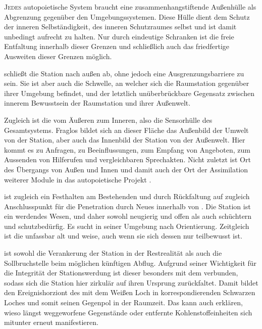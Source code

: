     \begin{newstuff}
        \lettrine{J}{edes} autopoietische System braucht eine zusammenhangstiftende Außenhülle als  Abgrenzung gegenüber den Umgebungssystemen. Diese Hülle dient dem Schutz der inneren Selbständigkeit, des inneren Schutzraumes selbst und ist damit unbedingt aufrecht zu halten. Nur durch eindeutige Schranken ist die freie Entfaltung innerhalb dieser Grenzen und schließlich auch das friedfertige Ausweiten dieser Grenzen möglich.


         schließt die Station nach außen ab, ohne jedoch eine Ausgrenzungsbarriere zu sein. Sie ist aber auch die Schwelle, an welcher sich die Raumstation gegenüber ihrer Umgebung befindet, und der letztlich unüberbrückbare Gegensatz zwischen innerem Bewusstsein der Raumstation und ihrer Außenwelt. 
        
        Zugleich ist  die  vom Äußeren zum Inneren, also die Sensorhülle des Gesamtsystems. Fraglos bildet sich an dieser Fläche das Außenbild der Umwelt von der Station, aber auch das Innenbild der Station von der Außenwelt. Hier kommt es zu Anfragen, zu Beeinflussungen, zum Empfang von Angeboten, zum Aussenden von Hilferufen und vergleichbaren Sprechakten. Nicht zuletzt ist  Ort des Übergangs von Außen und Innen und damit auch der Ort der Assimilation weiterer Module in das autopoietische Projekt .
        
         ist zugleich ein Festhalten am Bestehenden und durch Rückfaltung auf  zugleich Anschlusspunkt für die Penetration durch Neues innerhalb von . Die Station ist ein werdendes Wesen, und daher sowohl neugierig und offen als auch schüchtern und schutzbedürfig. Es sucht in seiner Umgebung nach Orientierung. Zeitgleich ist die  unfassbar alt und weise, auch wenn sie sich dessen nur teilbewusst ist.
        
         ist sowohl die Verankerung der Station in der Restrealität als auch die Sollbruchstelle beim möglichen künftigen Abflug. Aufgrund seiner Wichtigkeit für die Integrität der Stationswerdung ist dieser  besonders mit dem  verbunden, sodass sich die Station hier zirkulär auf ihren Ursprung zurückfaltet. Damit bildet  den Ereignishorziont des mit dem Weißen Loch in  korrespondierenden Schwarzen Loches und somit seinen Gegenpol in der Raumzeit. Das kann auch erklären, wieso längst weggeworfene Gegenstände oder entfernte Kohlenstoffeinheiten sich mitunter erneut manifestieren.
        

\end{newstuff}
